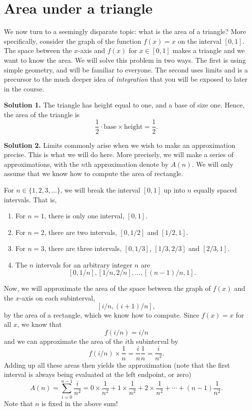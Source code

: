 \section{Area under a triangle}

We now turn to a seemingly disparate topic: what is the area of a
triangle?  More specifically, consider the graph of the function $f(x)
= x$ on the interval $[0,1]$.  The space between the $x$-axis and
$f(x)$ for $x\in [0,1]$ makes a triangle and we want to know the area.
We will solve this problem in two ways.  The first is using simple
geometry, and will be familiar to everyone.  The second uses limits
and is a precursor to the much deeper idea of \textit{integration}
that you will be exposed to later in the course.

\vspace{.2in}

\noindent \textbf{Solution 1.}  The triangle has height equal to one,
and a base of size one.  Hence, the area of the triangle is
\[
\frac{1}{2} \cdot \text{base} \times \text{height} = \frac{1}{2}.
\]

\vspace{.1in}

\noindent \textbf{Solution 2.} Limits commonly arise when we wish to
make an approximation precise.  This is what we will do here.  More
precisely, we will make a series of approximations, with the $n$th
approximation denote by $A(n)$.  We will only assume that we know how
to compute the area of rectangle.

For $n \in \{1,2,3,\dots\}$, we will break the interval $[0,1]$ up
into $n$ equally spaced intervals.  That is,
\begin{enumerate}
\item For $n = 1$, there is only one interval, $[0,1]$.
\item For $n = 2$, there are two intervals, $[0,1/2]$ and $[1/2,1]$.
\item For $n = 3$, there are three intervals, $[0,1/3]$, $[1/3,2/3]$
  and $[2/3,1]$.
\item The $n$ intervals for an arbitrary integer $n$ are
  \[
  [0,1/n], [1/n,2/n], \dots, [(n-1)/n, 1].
  \]
\end{enumerate}
Now, we will approximate the area of the space between the graph of
$f(x)$ and the $x$-axis on each subinterval,
\[
[i/n,(i+1)/n],
\]
by the area of a rectangle, which we know how to compute.  Since $f(x)
= x$ for all $x$, we know that
\[
f(i/n) = i/n
\]
and we can approximate the area of the $i$th subinterval by
\[
f(i/n)\times \frac{1}{n} = \frac{i}{n} \frac{1}{n} = \frac{i}{n^2}.
\]
Adding up all these areas then yields the approximation (note that the
first interval is always being evaluated at the left endpoint, or
zero)
\[
A(n) = \sum_{i = 0}^{n-1} \frac{i}{n^2} = 0\times \frac{1}{n^2} +
1\times \frac{1}{n^2} + 2 \times \frac{1}{n^2} + \cdots + (n-1)
\frac{1}{n^2}.
\]
Note that $n$ is fixed in the above sum!

